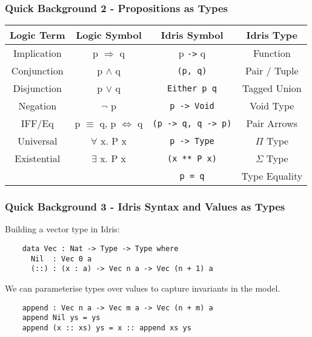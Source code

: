 \documentclass{beamer}
\begin{document}
\begin{frame}[fragile]
  \frametitle{Quick Background 2 - Propositions as Types}
     \begin{table}[h!]
    \begin{tabular}{c|c|c|c}
    \textbf{Logic Term} & \textbf{Logic Symbol} & 
    \textbf{Idris Symbol} & \textbf{Idris Type} \\
    \hline
      Implication & p $\Rightarrow$ q & p \texttt{->} q
      & Function \\
      Conjunction & p $\land$ q & \texttt{(p, q)} 
      & Pair / Tuple \\
      Disjunction & p $\lor$ q & \texttt{Either p q}
      & Tagged Union\\
      Negation & $\lnot$ p & \texttt{p -> Void} &
      Void Type \\
      IFF/Eq & p $\equiv$ q, p $\iff$ q & 
        \texttt{(p -> q, q -> p)} 
      & Pair Arrows \\
      Universal & $\forall$ x. P x & 
      \texttt{p -> Type} & $\Pi$ Type \\
      Existential & $\exists$ x. P x 
      & \texttt{(x ** P x)} & $\Sigma$ Type \\
      \hline
       & & \texttt{p = q} & Type Equality
    \end{tabular}
  \end{table}
\end{frame}

\begin{frame}[fragile]
  \frametitle{Quick Background 3 - Idris Syntax and Values as Types}
  Building a vector type in Idris: 
  \begin{verbatim}
    data Vec : Nat -> Type -> Type where
      Nil  : Vec 0 a
      (::) : (x : a) -> Vec n a -> Vec (n + 1) a
  \end{verbatim}
  We can parameterise types over values to capture invariants in 
  the model.
  \begin{verbatim}
    append : Vec n a -> Vec m a -> Vec (n + m) a
    append Nil ys = ys
    append (x :: xs) ys = x :: append xs ys 
  \end{verbatim}
\end{frame}
\end{document}

